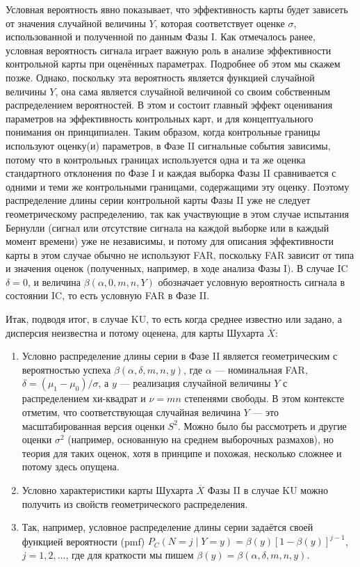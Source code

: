 Условная вероятность явно показывает, что эффективность карты будет зависеть от значения случайной величины \(Y\), которая соответствует оценке \(\sigma\), использованной и полученной по данным Фазы I. Как отмечалось ранее, условная вероятность сигнала играет важную роль в анализе эффективности контрольной карты при оценённых параметрах. Подробнее об этом мы скажем позже. Однако, поскольку эта вероятность является функцией случайной величины \(Y\), она сама является случайной величиной со своим собственным распределением вероятностей. В этом и состоит главный эффект оценивания параметров на эффективность контрольных карт, и для концептуального понимания он принципиален. Таким образом, когда контрольные границы используют оценку(и) параметров, в Фазе II сигнальные события зависимы, потому что в контрольных границах используется одна и та же оценка стандартного отклонения по Фазе I и каждая выборка Фазы II сравнивается с одними и теми же контрольными границами, содержащими эту оценку. Поэтому распределение длины серии контрольной карты Фазы II уже не следует геометрическому распределению, так как участвующие в этом случае испытания Бернулли (сигнал или отсутствие сигнала на каждой выборке или в каждый момент времени) уже не независимы, и потому для описания эффективности карты в этом случае обычно не используют FAR, поскольку FAR зависит от типа и значения оценок (полученных, например, в ходе анализа Фазы I). В случае IC \(\delta = 0\), и величина \(\beta(\alpha, 0, m, n, Y)\) обозначает условную вероятность сигнала в состоянии IC, то есть условную FAR в Фазе II.

Итак, подводя итог, в случае KU, то есть когда среднее известно или задано, а дисперсия неизвестна и потому оценена, для карты Шухарта \(\overline{X}\):

\begin{enumerate}
	\item Условно распределение длины серии в Фазе II является геометрическим с вероятностью успеха \(\beta(\alpha, \delta, m, n, y)\), где \(\alpha\) — номинальная FAR, \(\delta = (\mu_1 - \mu_0)/\sigma\), а \(y\) — реализация случайной величины \(Y\) с распределением хи-квадрат и \(\nu = mn\) степенями свободы. В этом контексте отметим, что соответствующая случайная величина \(Y\) — это масштабированная версия оценки \(S^2\). Можно было бы рассмотреть и другие оценки \(\sigma^2\) (например, основанную на среднем выборочных размахов), но теория для таких оценок, хотя в принципе и похожая, несколько сложнее и потому здесь опущена.
	\item Условно характеристики карты Шухарта \(\overline{X}\) Фазы II в случае KU можно получить из свойств геометрического распределения.
	\item Так, например, условное распределение длины серии задаётся своей функцией вероятности (pmf) \(P_C(N = j \mid Y = y) = \beta(y)[1 - \beta(y)]^{j-1}\), \(j = 1, 2, \ldots\), где для краткости мы пишем \(\beta(y) = \beta(\alpha, \delta, m, n, y)\).
\end{enumerate}

